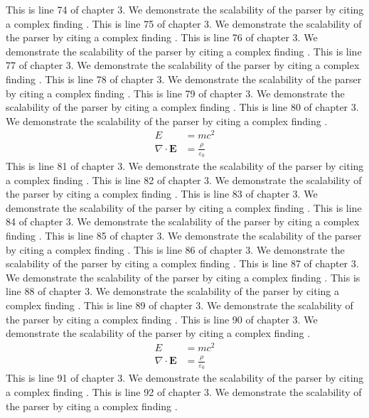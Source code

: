 This is line 74 of chapter 3. We demonstrate the scalability of the parser by citing a complex finding \cite{ref3_74}.
This is line 75 of chapter 3. We demonstrate the scalability of the parser by citing a complex finding \cite{ref3_75}.
This is line 76 of chapter 3. We demonstrate the scalability of the parser by citing a complex finding \cite{ref3_76}.
This is line 77 of chapter 3. We demonstrate the scalability of the parser by citing a complex finding \cite{ref3_77}.
This is line 78 of chapter 3. We demonstrate the scalability of the parser by citing a complex finding \cite{ref3_78}.
This is line 79 of chapter 3. We demonstrate the scalability of the parser by citing a complex finding \cite{ref3_79}.
This is line 80 of chapter 3. We demonstrate the scalability of the parser by citing a complex finding \cite{ref3_80}.
\begin{align*}
  E &= mc^2 \\
  \nabla \cdot \mathbf{E} &= \frac{\rho}{\varepsilon_0}
\end{align*}
This is line 81 of chapter 3. We demonstrate the scalability of the parser by citing a complex finding \cite{ref3_81}.
This is line 82 of chapter 3. We demonstrate the scalability of the parser by citing a complex finding \cite{ref3_82}.
This is line 83 of chapter 3. We demonstrate the scalability of the parser by citing a complex finding \cite{ref3_83}.
This is line 84 of chapter 3. We demonstrate the scalability of the parser by citing a complex finding \cite{ref3_84}.
This is line 85 of chapter 3. We demonstrate the scalability of the parser by citing a complex finding \cite{ref3_85}.
This is line 86 of chapter 3. We demonstrate the scalability of the parser by citing a complex finding \cite{ref3_86}.
This is line 87 of chapter 3. We demonstrate the scalability of the parser by citing a complex finding \cite{ref3_87}.
This is line 88 of chapter 3. We demonstrate the scalability of the parser by citing a complex finding \cite{ref3_88}.
This is line 89 of chapter 3. We demonstrate the scalability of the parser by citing a complex finding \cite{ref3_89}.
This is line 90 of chapter 3. We demonstrate the scalability of the parser by citing a complex finding \cite{ref3_90}.
\begin{align*}
  E &= mc^2 \\
  \nabla \cdot \mathbf{E} &= \frac{\rho}{\varepsilon_0}
\end{align*}
This is line 91 of chapter 3. We demonstrate the scalability of the parser by citing a complex finding \cite{ref3_91}.
This is line 92 of chapter 3. We demonstrate the scalability of the parser by citing a complex finding \cite{ref3_92}.
